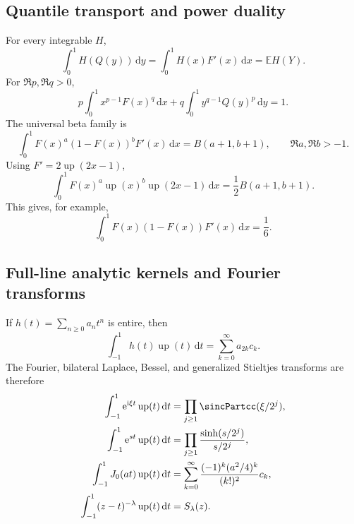 \documentclass[11pt,oneside]{article}
\theoremstyle{definition}
\theoremstyle{remark}
\newcommand{\Up}{\operatorname{up}}
\newcommand{\E}{\mathbb E}
\newcommand{\dd}{\,\mathrm d}
\newcommand{\e}{\mathrm e}
\newcommand{\ii}{\mathrm i}
\newcommand{\1}{\mathbf 1}
\begin{document}
\subsection{Quantile transport and power duality}

For every integrable $H$,
\begin{equation}
 \int_0^1H(Q(y))\dd y
 =\int_0^1H(x)F'(x)\dd x
 =\E H(Y).
 \label{p9:eq:quantile-transport}
\end{equation}
For $\Re p,\Re q>0$,
\begin{equation}
 p\int_0^1x^{p-1}F(x)^q\dd x
 +q\int_0^1y^{q-1}Q(y)^p\dd y=1.
 \label{p9:eq:power-duality}
\end{equation}
The universal beta family is
\begin{equation}
 \int_0^1F(x)^a(1-F(x))^bF'(x)\dd x
 =B(a+1,b+1),
 \qquad \Re a,\Re b>-1.
 \label{p9:eq:universal-beta}
\end{equation}
Using $F'=2\Up(2x-1)$,
\begin{equation}
 \int_0^1F(x)^a\Up(x)^b\Up(2x-1)\dd x
 =\frac12B(a+1,b+1).
 \label{p9:eq:up-beta-combination}
\end{equation}
This gives, for example,
\begin{equation}
 \int_0^1F(x)(1-F(x))F'(x)\dd x=\frac16.
 \label{p9:eq:F-survival-density}
\end{equation}

\subsection{Full-line analytic kernels and Fourier transforms}

If $h(t)=\sum_{n\ge0}a_nt^n$ is entire, then
\begin{equation}
 \int_{-1}^1h(t)\Up(t)\dd t
 =\sum_{k=0}^{\infty}a_{2k}c_k.
 \label{p9:eq:entire-kernel-up}
\end{equation}
The Fourier, bilateral Laplace, Bessel, and generalized Stieltjes transforms
are therefore
\begin{align}
 \int_{-1}^1\e^{\ii\xi t}\Up(t)\dd t
 &=\prod_{j\ge1}\sincPartcc(\xi/2^j),
 \label{p9:eq:Fourier-up-catalog}\\
 \int_{-1}^1\e^{st}\Up(t)\dd t
 &=\prod_{j\ge1}\frac{\sinh(s/2^j)}{s/2^j},
 \label{p9:eq:bilateral-Laplace-up}\\
 \int_{-1}^1J_0(at)\Up(t)\dd t
 &=\sum_{k=0}^{\infty}
   \frac{(-1)^k(a^2/4)^k}{(k!)^2}c_k,
 \label{p9:eq:Bessel-up}\\
 \int_{-1}^1(z-t)^{-\lambda}\Up(t)\dd t
 &=S_\lambda(z).
 \label{p9:eq:Stieltjes-catalog}
\end{align}
\end{document}
